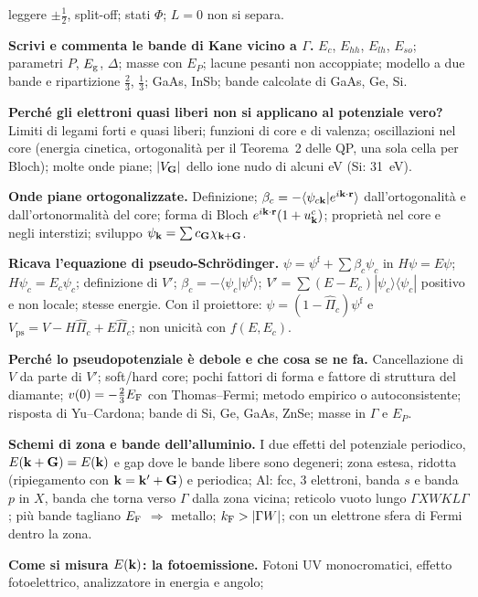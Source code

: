 \documentclass[11pt,a4paper]{article}
\begin{document}
\begin{domande}
leggere $\pm\frac12$, split-off; stati $\Phi$; $L=0$ non si separa.
\item \textbf{Scrivi e commenta le bande di Kane vicino a $\Gamma$.} $E_c$, $E_{hh}$, $E_{lh}$, $E_{so}$; parametri $P$, $E_{\mathrm g}$, $\Delta$; masse con $E_P$;
lacune pesanti non accoppiate; modello a due bande e ripartizione $\frac23$, $\frac13$; GaAs, InSb; bande calcolate di GaAs, Ge, Si.
\item \textbf{Perché gli elettroni quasi liberi non si applicano al potenziale vero?} Limiti di legami forti e quasi liberi; funzioni di core e di
valenza; oscillazioni nel core (energia cinetica, ortogonalità per il Teorema~2 delle QP, una sola cella per Bloch); molte onde piane; $|V_{\mathbf G}|$
dello ione nudo di alcuni eV (Si: \SI{31}{eV}).
\item \textbf{Onde piane ortogonalizzate.} Definizione; $\beta_c=-\langle\psi_{c\mathbf k}|e^{i\mathbf k\cdot\mathbf r}\rangle$ dall'ortogonalità e dall'ortonormalità del
core; forma di Bloch $e^{i\mathbf k\cdot\mathbf r}(1+u^c_{\mathbf k})$; proprietà nel core e negli interstizi; sviluppo $\psi_{\mathbf k}=\sum c_{\mathbf G}\chi_{\mathbf k+\mathbf G}$.
\item \textbf{Ricava l'equazione di pseudo-Schrödinger.} $\psi=\psi^{\mathrm f}+\sum\beta_c\psi_c$ in $H\psi=E\psi$; $H\psi_c=E_c\psi_c$; definizione di
$V'$; $\beta_c=-\langle\psi_c|\psi^{\mathrm f}\rangle$; $V'=\sum(E-E_c)|\psi_c\rangle\langle\psi_c|$ positivo e non locale; stesse energie. Con il
proiettore: $\psi=(1-\hat\Pi_c)\psi^{\mathrm f}$ e $V_{\mathrm{ps}}=V-H\hat\Pi_c+E\hat\Pi_c$; non unicità con $f(E,E_c)$.
\item \textbf{Perché lo pseudopotenziale è debole e che cosa se ne fa.} Cancellazione di $V$ da parte di $V'$; soft/hard core; pochi fattori di forma
e fattore di struttura del diamante; $v(0)=-\frac23E_{\mathrm F}$ con Thomas--Fermi; metodo empirico o autoconsistente; risposta di Yu--Cardona; bande di Si,
Ge, GaAs, ZnSe; masse in $\Gamma$ e $E_P$.
\item \textbf{Schemi di zona e bande dell'alluminio.} I due effetti del potenziale periodico, $E(\mathbf k+\mathbf G)=E(\mathbf k)$ e gap dove le bande libere sono
degeneri; zona estesa, ridotta (ripiegamento con $\mathbf k=\mathbf k'+\mathbf G$) e periodica; Al: fcc, 3 elettroni, banda $s$ e banda $p$ in $X$, banda che torna
verso $\Gamma$ dalla zona vicina; reticolo vuoto lungo $\Gamma XWKL\Gamma$; più bande tagliano $E_{\mathrm F}$ $\Rightarrow$ metallo; $k_{\mathrm F}>|\Gamma W|$; con un
elettrone sfera di Fermi dentro la zona.
\item \textbf{Come si misura $E(\mathbf k)$: la fotoemissione.} Fotoni UV monocromatici, effetto fotoelettrico, analizzatore in energia e angolo;

\end{domande}
\end{document}
